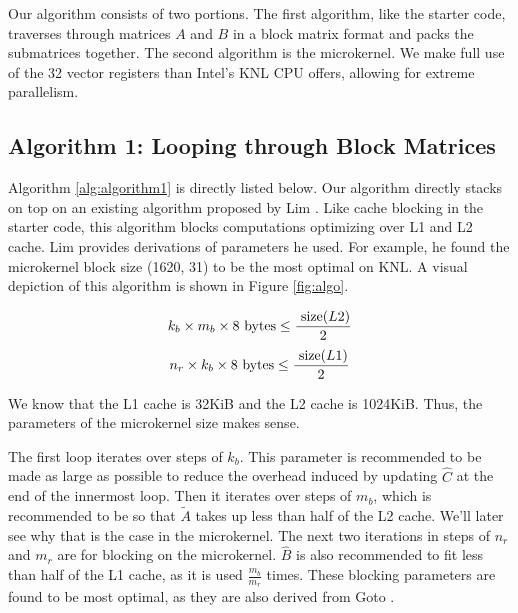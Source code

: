 \documentclass{article}
\begin{document}
Our algorithm consists of two portions. The first algorithm, like the starter code, traverses through matrices $A$ and $B$ in a block matrix format and packs the submatrices together. The second algorithm is the microkernel. We make full use of the 32 vector registers than Intel's KNL CPU offers, allowing for extreme parallelism. 

\subsection{Algorithm 1: Looping through Block Matrices}
Algorithm \ref{alg:algorithm1} is directly listed below. Our algorithm directly stacks on top on an existing algorithm proposed by Lim \cite{10.1007/s10586-018-2810-y}. Like cache blocking in the starter code, this algorithm blocks computations optimizing over L1 and L2 cache. Lim provides derivations of parameters he used. For example, he found the microkernel block size (1620, 31) to be the most optimal on KNL. A visual depiction of this algorithm is shown in Figure \ref{fig:algo}.

$$k_b \times m_b \times 8 \textnormal{ bytes} \leq \frac{\textnormal{ size}(L2)}{2}$$
$$n_r \times k_b \times 8 \textnormal{ bytes} \leq \frac{\textnormal{ size}(L1)}{2}$$

We know that the L1 cache is 32KiB and the L2 cache is 1024KiB. Thus, the parameters of the microkernel size makes sense.

The first loop iterates over steps of $k_b$. This parameter is recommended to be made as large as possible to reduce the overhead induced by updating $\hat{C}$ at the end of the innermost loop. Then it iterates over steps of $m_b$, which is recommended to be so that $\tilde{A}$ takes up less than half of the L2 cache. We'll later see why that is the case in the microkernel. The next two iterations in steps of $n_r$ and $m_r$ are for blocking on the microkernel. $\hat{B}$ is also recommended to fit less than half of the L1 cache, as it is used $\frac{m_b}{m_r}$ times. These blocking parameters are found to be most optimal, as they are also derived from Goto \cite{10.1145/1356052.1356053}.
\end{document}
